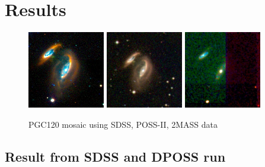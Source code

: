 \documentclass[5p]{elsarticle}
\begin{document}
\section{Results}
\begin{figure}[t!]
\centering
	\includegraphics[width=0.3\textwidth]{figures/SDSS_120_LOW}
	\includegraphics[width=0.3\textwidth]{figures/DSS_120_BEST}	
	\includegraphics[width=0.3\textwidth]{figures/2MASS_120_BEST}
	\caption{PGC120 mosaic using SDSS, POSS-II, 2MASS data }
	\label{fig:comparison}
\end{figure}
\subsection{Result from SDSS and DPOSS run}
\end{document}
